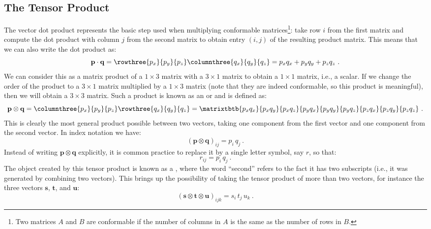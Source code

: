 \subsection{The Tensor Product}
The vector dot product represents the basic step used when multiplying conformable matrices\footnote{Two matrices $A$ and $B$ are conformable if the number of columns in $A$ is the same as the number of rows in $B$.}: take row $i$ from the first matrix and compute the dot product with column $j$ from the second matrix to obtain entry $(i,j)$ of the resulting product matrix. This means that we can also write the dot product as:
\begin{equation}
	\mathbf{p}\cdot\mathbf{q} = \rowthree{p_x}{p_y}{p_z}\columnthree{q_x}{q_y}{q_z} = p_xq_x+p_yq_y+p_zq_z\ .
\end{equation}
We can consider this as a matrix product of a $1\times 3$ matrix with a $3\times 1$ matrix to obtain a $1\times 1$ matrix, i.e., a scalar. If we change the order of the product to a $3\times 1$ matrix multiplied by a $1\times 3$ matrix (note that they are indeed conformable, so this product is meaningful), then we will obtain a $3\times 3$ matrix.  Such a product is known as an  or  and is defined as:
\begin{equation}
	\mathbf{p}\otimes\mathbf{q} = \columnthree{p_x}{p_y}{p_z}\rowthree{q_x}{q_y}{q_z}=\matrixtbtb{p_xq_x}{p_xq_y}{p_xq_z}{p_yq_x}{p_yq_y}{p_yq_z}{p_zq_x}{p_zq_y}{p_zq_z}\ .
\end{equation}
This is clearly the most general product possible between two vectors, taking one component from the first vector and one component from the second vector.  In index notation we have:
\begin{equation}
	(\mathbf{p}\otimes\mathbf{q})_{ij} = p_i\, q_j\ .
\end{equation}
Instead of writing $\mathbf{p}\otimes\mathbf{q}$ explicitly, it is common practice to replace it by a single letter symbol, say $r$, so that:
\begin{equation}
	r_{ij} = p_i\, q_j\ .
\end{equation}
The object created by this tensor product is known as a , where the word ``second'' refers to the fact it has two subscripts (i.e., it was generated by combining two vectors). This brings up the possibility of taking the tensor product of more than two vectors, for instance the three vectors $\mathbf{s}$, $\mathbf{t}$, and $\mathbf{u}$:
\begin{equation}
	(\mathbf{s}\otimes\mathbf{t}\otimes\mathbf{u})_{ijk} = s_i\,t_j\,u_k\ .
\end{equation}
